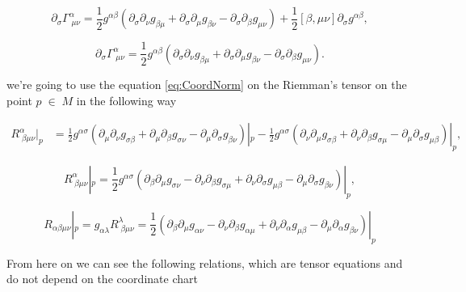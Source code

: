         \begin{equation}
            \partial_{\sigma}\Gamma^{\alpha}_{\;\mu\nu} = \frac{1}{2}g^{\alpha\beta}\left(\partial_{\sigma}\partial_{\nu}g_{\beta\mu} + \partial_{\sigma}\partial_{\mu}g_{\beta\nu} - \partial_{\sigma}\partial_{\beta}g_{\mu\nu} \right) + \frac{1}{2}\left[\beta,\mu\nu \right]\partial_{\sigma}g^{\alpha\beta},
        \end{equation}

        \begin{equation}\label{eq:CoordNorm}
            \partial_{\sigma}\Gamma^{\alpha}_{\;\mu\nu} = \frac{1}{2}g^{\alpha\beta}\left(\partial_{\sigma}\partial_{\nu}g_{\beta\mu} + \partial_{\sigma}\partial_{\mu}g_{\beta\nu} - \partial_{\sigma}\partial_{\beta}g_{\mu\nu} \right).
        \end{equation}
        
we're going to use the equation \ref{eq:CoordNorm}
on the Riemman's tensor on the point  $p \;\in\;M$  in the following way

\begin{align*}
R^{\alpha}_{\;\beta\mu\nu}|_p &= \frac{1}{2}g^{\alpha\sigma}\left(\partial_{\mu}\partial_{\nu}g_{\sigma\beta} +\partial_{\mu}\partial_{\beta}g_{\sigma\nu} - \partial_{\mu}\partial_{\sigma}g_{\beta\nu} \right)|_p - \frac{1}{2}g^{\alpha\sigma}\left(\partial_{\nu}\partial_{\mu}g_{\sigma\beta} + \partial_{\nu}\partial_{\beta}g_{\sigma\mu} - \partial_{\mu}\partial_{\sigma}g_{\mu\beta} \right)|_p,
\end{align*}

\begin{equation}
    R^{\alpha}_{\;\beta\mu\nu}|_p = \frac{1}{2}g^{\alpha\sigma}\left(\partial_{\beta}\partial_{\mu}g_{\sigma\nu} - \partial_{\nu}\partial_{\beta}g_{\sigma\mu} + \partial_{\nu}\partial_{\sigma}g_{\mu\beta} - \partial_{\mu}\partial_{\sigma}g_{\beta\nu} \right)|_p,
\end{equation}

\begin{equation}
    R_{\alpha\beta\mu\nu}|_p = g_{\alpha\lambda}R^{\lambda}_{\;\beta\mu\nu} = \frac{1}{2} \left(\partial_{\beta}\partial_{\mu}g_{\alpha\nu} - \partial_{\nu}\partial_{\beta}g_{\alpha\mu} + \partial_{\nu}\partial_{\alpha}g_{\mu\beta} - \partial_{\mu}\partial_{\alpha}g_{\beta\nu} \right)|_p
\end{equation}

From here on we can see the following relations, which are tensor equations and do not depend on the coordinate chart


